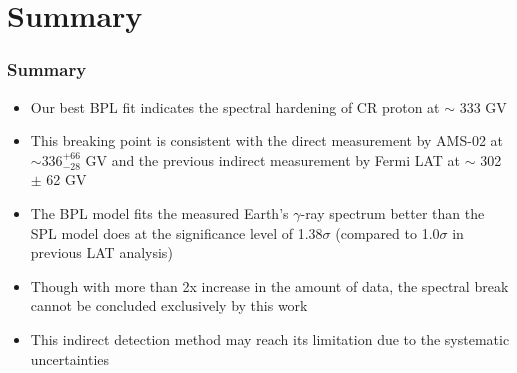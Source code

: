 \documentclass{beamer}
\begin{document}
\section{Summary}
\begin{frame}
\frametitle{Summary}
\begin{itemize}
  \item Our best BPL fit indicates the spectral hardening of
  CR proton at $\sim$ 333 GV
  \item This breaking point is consistent with the direct measurement
  by AMS-02 at $\sim 336^{+66}_{-28}$ GV and the previous indirect measurement
  by Fermi LAT at $\sim$ 302 $\pm$ 62 GV
  \item The BPL model fits the measured Earth's $\gamma$-ray
  spectrum better than the SPL model does at the significance
  level of 1.38$\sigma$ (compared to 1.0$\sigma$ in previous
  LAT analysis)
  \item Though with more than 2x increase in the amount of data,
  the spectral break cannot be concluded exclusively by this work
  \item This indirect detection method may reach its limitation
  due to the systematic uncertainties
\end{itemize}

\end{frame}




\appendix
\end{document}
